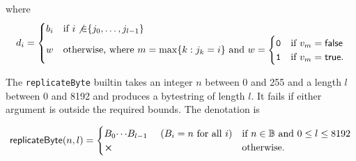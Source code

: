 \noindent where
$$
  d_i =
  \begin{cases}
    b_i & \text{if $i \not{\in} \{j_0, \ldots, j_{l-1}\}$}\\
    w & \text{otherwise, where $m = \max\{k : j_k = i\}$ and }
      w=\begin{cases}
      \mathtt{0} & \text{if $v_m = \mathsf{false}$}\\
      \mathtt{1} & \text{if $v_m = \mathsf{true}$}.
    \end{cases}
  \end{cases}
$$


\label{note:replicateByte}

The \texttt{replicateByte} builtin takes an integer $n$ between 0 and 255 and a
length $l$ between 0 and 8192 and produces a bytestring of length $l$.  It fails
if either argument is outside the required bounds.  The denotation is

$$
\mathsf{replicateByte}(n,l) =
\begin{cases}
B_0{\cdots}B_{l-1} \quad\text{ ($B_i=n$ for all $i$}) & \text{if $n \in \B$ and $0 \leq l \leq 8192$}\\
\errorX      & \text{otherwise}.
\end{cases}
$$

